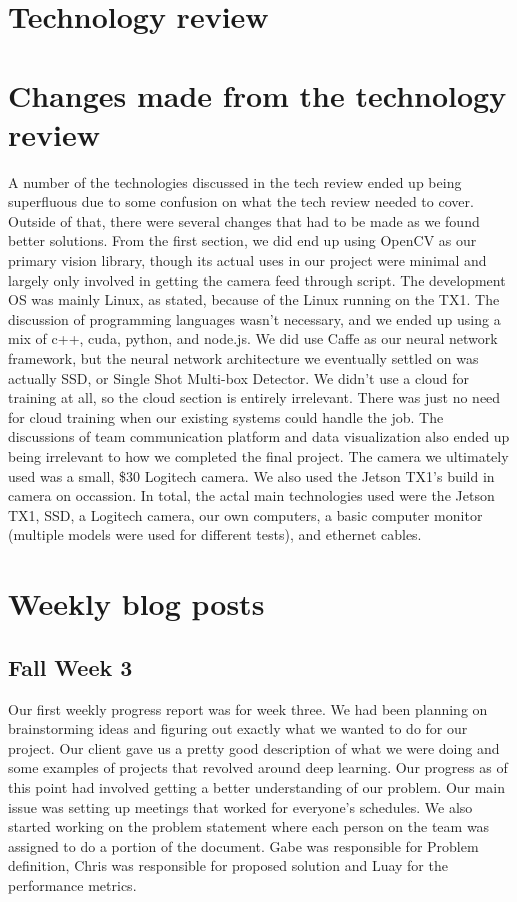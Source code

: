 \documentclass[onecolumn, draftclsnofoot,10pt, compsoc]{IEEEtran}
\begin{document}
\section{Technology review}



\section{Changes made from the technology review}
A number of the technologies discussed in the tech review ended up being superfluous due to some confusion on what the tech review needed to cover.
Outside of that, there were several changes that had to be made as we found better solutions. 
From the first section, we did end up using OpenCV as our primary vision library, though its actual uses in our project were minimal and largely only involved in getting the camera feed through script.
The development OS was mainly Linux, as stated, because of the Linux running on the TX1.
The discussion of programming languages wasn't necessary, and we ended up using a mix of c++, cuda, python, and node.js.
We did use Caffe as our neural network framework,  but the neural network architecture we eventually settled on was actually SSD, or Single Shot Multi-box Detector.
We didn't use a cloud for training at all, so the cloud section is entirely irrelevant.
There was just no need for cloud training when our existing systems could handle the job.
The discussions of team communication platform and data visualization also ended up being irrelevant to how we completed the final project. 
The camera we ultimately used was a small, \$30 Logitech camera. 
We also used the Jetson TX1's build in camera on occassion. 
In total, the actal main technologies used were the Jetson TX1, SSD, a Logitech camera, our own computers, a basic computer monitor (multiple models were used for different tests), and ethernet cables.

\section{Weekly blog posts}

\subsection{Fall Week 3}
Our first weekly progress report was for week three.
We had been planning on brainstorming ideas and figuring out exactly what we wanted to do for our project.
Our client gave us a pretty good description of what we were doing and some examples of projects that revolved around deep learning.
Our progress as of this point had involved getting a better understanding of our problem.
Our main issue was setting up meetings that worked for everyone's schedules.
We also started working on the problem statement where each person on the team was assigned to do a portion of the document.
Gabe was responsible for Problem definition, Chris was responsible for proposed solution and Luay for the performance metrics.
\end{document}
